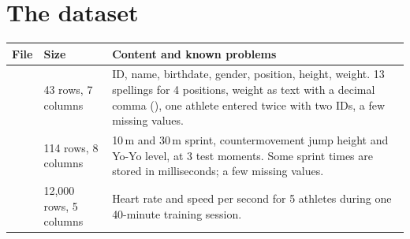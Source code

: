 \section{The dataset}

\noindent
{}
\begin{tabularx}{\textwidth}{@{}L{3.1cm}L{3.2cm}Y@{}}
\toprule
\textbf{File} & \textbf{Size} & \textbf{Content and known problems} \\
\midrule
{}   & 43 rows, 7 columns   & ID, name, birthdate, gender, position, height, weight. 13 spellings for 4 positions, weight as text with a decimal comma (), one athlete entered twice with two IDs, a few missing values. \\
      & 114 rows, 8 columns  & 10\,m and 30\,m sprint, countermovement jump height and Yo-Yo level, at 3 test moments. Some sprint times are stored in milliseconds; a few missing values. \\
 & 12,000 rows, 5 columns & Heart rate and speed per second for 5 athletes during one 40-minute training session. \\
\bottomrule
\end{tabularx}
